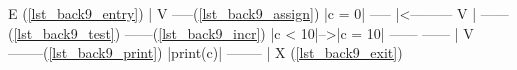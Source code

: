 \begin{minipage}[t]{2in}%
\label{lst_back9_entry}%
\label{lst_back9_assign}%
\label{lst_back9_test}%
\label{lst_back9_incr}%
\label{lst_back9_print}%
\label{lst_back9_exit}%
\begin{AVerb}
        E (\ref{lst_back9_entry})
        |
        V
      -----(\ref{lst_back9_assign})
     |c = 0|
      -----
        |<---------
        V          |
      ------(\ref{lst_back9_test})  ------(\ref{lst_back9_incr})
     |c < 10|-->|c = 10|
      ------     ------
        |
        V
     --------(\ref{lst_back9_print})
    |print(c)|
     --------
        |
        X (\ref{lst_back9_exit})
\end{AVerb}
\end{minipage}
